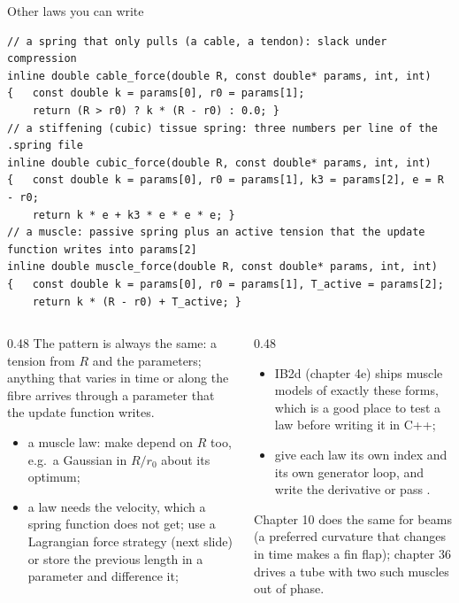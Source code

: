 \documentclass[aspectratio=169,11pt]{beamer}
\begin{document}
\begin{frame}[fragile]{Other laws you can write}
\label{fr:laws}
\begin{lstlisting}[style=cpptiny]
// a spring that only pulls (a cable, a tendon): slack under compression
inline double cable_force(double R, const double* params, int, int)
{   const double k = params[0], r0 = params[1];
    return (R > r0) ? k * (R - r0) : 0.0; }
// a stiffening (cubic) tissue spring: three numbers per line of the .spring file
inline double cubic_force(double R, const double* params, int, int)
{   const double k = params[0], r0 = params[1], k3 = params[2], e = R - r0;
    return k * e + k3 * e * e * e; }
// a muscle: passive spring plus an active tension that the update function writes into params[2]
inline double muscle_force(double R, const double* params, int, int)
{   const double k = params[0], r0 = params[1], T_active = params[2];
    return k * (R - r0) + T_active; }
\end{lstlisting}
\begin{columns}[T,onlytextwidth]
\begin{column}{0.48\textwidth}
\scriptsize The pattern is always the same: a tension from $R$ and the parameters; anything that varies in time or along the fibre arrives through a parameter that the update function writes.
\begin{itemize}
  \item a  muscle law: make  depend on $R$ too, e.g.\ a Gaussian in $R/r_0$ about its optimum;
  \item a  law needs the velocity, which a spring function does not get; use a Lagrangian force strategy (next slide) or store the previous length in a parameter and difference it;
\end{itemize}
\end{column}
\begin{column}{0.48\textwidth}
\scriptsize
\begin{itemize}
  \item IB2d (chapter 4e) ships muscle models of exactly these forms, which is a good place to test a law before writing it in C++;
  \item give each law its own index and its own generator loop, and write the derivative or pass .
\end{itemize}
Chapter 10 does the same for beams (a preferred curvature that changes in time makes a fin flap); chapter 36 drives a tube with two such muscles out of phase.
\end{column}
\end{columns}
\end{frame}
\end{document}

